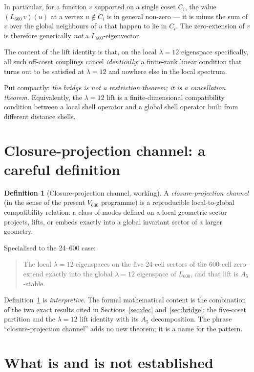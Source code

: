 \documentclass[11pt]{article}
\newcommand{\Vsix}{V_{600}}
\newcommand{\Lsix}{L_{600}}
\theoremstyle{definition}
\newtheorem{definition}{Definition}
\begin{document}
In particular, for a function $v$ supported on a single coset
$C_i$, the value $(\Lsix\, v)(u)$ at a vertex $u\notin C_i$ is in
general non-zero --- it is minus the sum of $v$ over the global
neighbours of $u$ that happen to lie in $C_i$.  The zero-extension
of $v$ is therefore generically \emph{not} a $\Lsix$-eigenvector.

The content of the lift identity is that, on the local
$\lambda=12$ eigenspace specifically, all such off-coset
couplings cancel \emph{identically}: a finite-rank linear
condition that turns out to be satisfied at $\lambda=12$ and
nowhere else in the local spectrum.

\medskip
\noindent
Put compactly: \emph{the bridge is not a restriction theorem; it
is a cancellation theorem.}  Equivalently, the $\lambda=12$ lift
is a finite-dimensional compatibility condition between a local
shell operator and a global shell operator built from different
distance shells.

\section{Closure-projection channel: a careful definition}\label{sec:channel}

\begin{definition}[Closure-projection channel, working]\label{def:cpc}
A \emph{closure-projection channel} (in the sense of the present
$\Vsix$ programme) is a reproducible local-to-global compatibility
relation: a class of modes defined on a local geometric sector
projects, lifts, or embeds exactly into a global invariant sector
of a larger geometry.
\end{definition}

Specialised to the 24--600 case:

\begin{quote}
The local $\lambda=12$ eigenspaces on the five 24-cell sectors of
the 600-cell zero-extend exactly into the global $\lambda=12$
eigenspace of $\Lsix$, and that lift is $A_5$-stable.
\end{quote}

Definition~\ref{def:cpc} is \emph{interpretive}.  The formal
mathematical content is the combination of the two exact results
cited in Sections~\ref{sec:dec} and~\ref{sec:bridge}: the
five-coset partition and the $\lambda=12$ lift identity with its
$A_5$ decomposition.  The phrase ``closure-projection channel''
adds no new theorem; it is a name for the pattern.

\section{What is and is not established}\label{sec:scope}
\end{document}

